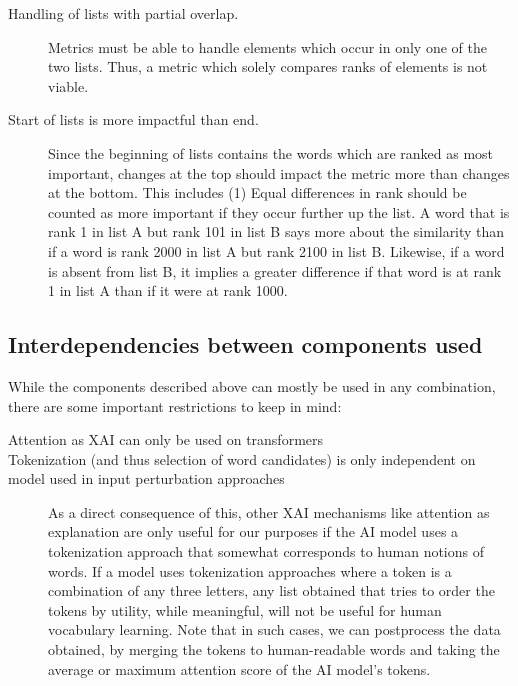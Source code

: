 \begin{description}
	\item [Handling of lists with partial overlap.]
	      Metrics must be able to handle elements which occur in only one of the two lists.
	      Thus, a metric which solely compares ranks of elements is not viable.
	\item [Start of lists is more impactful than end.]
	      Since the beginning of lists contains the words which are ranked as most important, changes at the top should impact the metric more than changes at the bottom. This includes (1) Equal differences in rank should be counted as more important if they occur further up the list.
	      A word that is rank 1 in list A but rank 101 in list B says more about the similarity than if a word is rank 2000 in list A but rank 2100 in list B. Likewise, if a word is absent from list B, it implies a greater difference if that word is at rank 1 in list A than if it were at rank 1000.
\end{description}

\subsection{Interdependencies between components used}

While the components described above can mostly be used in any combination, there are some important restrictions to keep in mind:

\begin{description}
	\item[Attention as XAI can only be used on transformers]
	\item[Tokenization (and thus selection of word candidates) is only independent on model used in input perturbation approaches]
		As a direct consequence of this, other XAI mechanisms like attention as explanation are only useful for our purposes if the AI model uses a tokenization approach that somewhat corresponds to human notions of words.
		If a model uses tokenization approaches where a token is a combination of any three letters, any list obtained that tries to order the tokens by utility, while meaningful, will not be useful for human vocabulary learning.
		Note that in such cases, we can postprocess the data obtained, by merging the tokens to human-readable words and taking the average or maximum attention score of the AI model's tokens.
	\item[]
\end{description}



